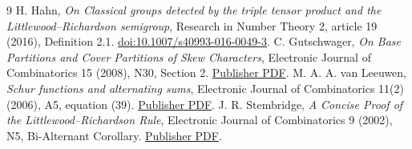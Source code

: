 \documentclass[11pt]{article}
\begin{document}
\par\clearpage
\begin{samepage}
\begin{thebibliography}{9}\small
\setlength{\itemsep}{0.2em}
 H. Hahn, \emph{On Classical groups detected by the triple tensor
product and the Littlewood--Richardson semigroup}, Research in Number Theory
2, article 19 (2016), Definition 2.1.
\href{https://doi.org/10.1007/s40993-016-0049-3}{doi:10.1007/s40993-016-0049-3}.
 C. Gutschwager, \emph{On Base Partitions and Cover
Partitions of Skew Characters}, Electronic Journal of Combinatorics 15
(2008), N30, Section 2.
\href{https://www.combinatorics.org/ojs/index.php/eljc/article/download/v15i1n30/pdf/}{Publisher PDF}.
 M. A. A. van Leeuwen, \emph{Schur functions and alternating
sums}, Electronic Journal of Combinatorics 11(2) (2006), A5, equation (39).
\href{https://www.combinatorics.org/ojs/index.php/eljc/article/download/v11i2a5/pdf/}{Publisher PDF}.
 J. R. Stembridge, \emph{A Concise Proof of the
Littlewood--Richardson Rule}, Electronic Journal of Combinatorics 9 (2002),
N5, Bi-Alternant Corollary.
\href{https://www.combinatorics.org/ojs/index.php/eljc/article/download/v9i1n5/pdf}{Publisher PDF}.
\end{thebibliography}
\end{samepage}
\end{document}
